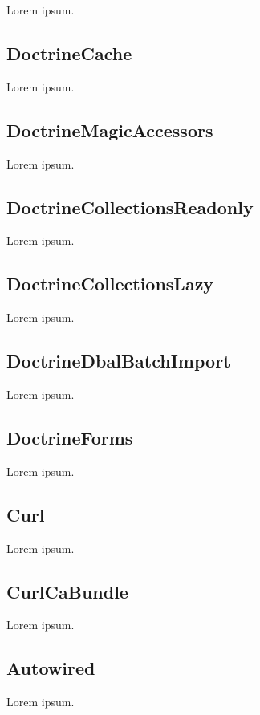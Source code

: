 Lorem ipsum.

\subsection{DoctrineCache}

Lorem ipsum.

\subsection{DoctrineMagicAccessors}

Lorem ipsum.

\subsection{DoctrineCollectionsReadonly}

Lorem ipsum.

\subsection{DoctrineCollectionsLazy}

Lorem ipsum.

\subsection{DoctrineDbalBatchImport}

Lorem ipsum.

\subsection{DoctrineForms}

Lorem ipsum.

\subsection{Curl}

Lorem ipsum.

\subsection{CurlCaBundle}

Lorem ipsum.

\subsection{Autowired}

Lorem ipsum.

